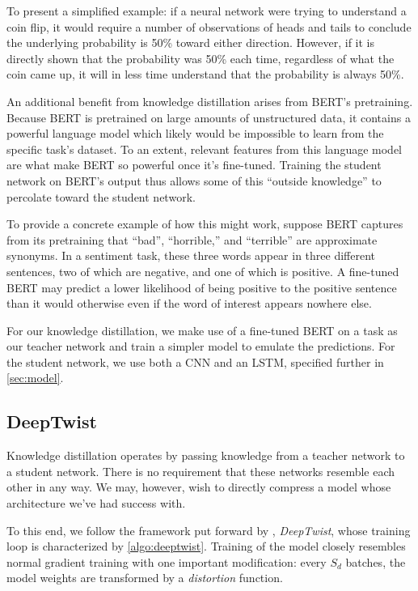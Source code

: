 \documentclass[10pt]{article}
\begin{document}
To present a simplified example: if a neural network were trying to understand
a coin flip, it would require a number of observations of heads and tails to
conclude the underlying probability is 50\% toward either direction. However,
if it is directly shown that the probability was 50\% each time, regardless of
what the coin came up, it will in less time understand that the probability is
always 50\%.

An additional benefit from knowledge distillation arises from BERT's
pretraining. Because BERT is pretrained on large amounts of unstructured
data, it contains a powerful language model which likely would be impossible
to learn from the specific task's dataset. To an extent, relevant features
from this language model are what make BERT so powerful once it's fine-tuned.
Training the student network on BERT's output thus allows some of this
``outside knowledge'' to percolate toward the student network.

To provide a concrete example of how this might work, suppose BERT captures
from its pretraining that ``bad'', ``horrible,'' and ``terrible'' are
approximate synonyms. In a sentiment task, these three words appear in three
different sentences, two of which are negative, and one of which is positive.
A fine-tuned BERT may predict a lower likelihood of being positive to the
positive sentence than it would otherwise even if the word of interest appears
nowhere else.

For our knowledge distillation, we make use of a fine-tuned BERT on a task as
our teacher network and train a simpler model to emulate the predictions. For
the student network, we use both a CNN and an LSTM, specified further in
\cref{sec:model}.

\subsection{DeepTwist}

Knowledge distillation operates by passing knowledge from a teacher network to a
student network. There is no requirement that these networks resemble each other
in any way. We may, however, wish to directly compress a model whose
architecture we've had success with.

To this end, we follow the framework put forward by \citet{lee2018deeptwist},
\emph{DeepTwist}, whose training loop is characterized by \cref{algo:deeptwist}.
Training of the model closely resembles normal gradient training with one
important modification: every $S_d$ batches, the model weights are transformed
by a \emph{distortion} function.
\end{document}
